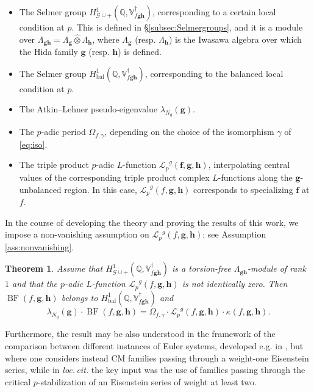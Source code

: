 \documentclass[a4paper,11pt]{amsart}
\theoremstyle{plain}
\newtheorem{theorem}{Theorem}[section]
\theoremstyle{definition}
\theoremstyle{remark}
\newcommand{\bb}{\mathbb}
\newcommand{\cl}{\mathcal}
\DeclareMathOperator{\BF}{BF}
\DeclareMathOperator{\bal}{bal}
\newcommand{\Lp}{{\mathscr{L}_p}}
\newcommand{\hf}{{\mathbf{f}}}
\newcommand{\hg}{{\mathbf{g}}}
\newcommand{\hh}{{\mathbf h}}
\numberwithin{equation}{section}
\begin{document}
\begin{itemize}
    \item[-] The Selmer group $H^1_{\cl{G}\cup +}(\bb{Q}, \bb{V}_{f\hg\hh}^\dagger)$, corresponding to a certain local condition at $p$. This is defined in  \S\ref{subsec:Selmergroups}, and it is a module over $\Lambda_{\hg\hh}=\Lambda_{\hg}\hat{\otimes}\Lambda_{\hh}$, where $\Lambda_{\hg}$ (resp. $\Lambda_{\hh}$) is the Iwasawa algebra over which the Hida family $\hg$ (resp. $\hh$) is defined.
    \item[-] The Selmer group $H^1_{\bal}(\bb{Q}, \bb{V}_{f\hg\hh}^\dagger)$, corresponding to the balanced local condition at $p$.
    \item[-] The Atkin--Lehner pseudo-eigenvalue $\lambda_{N_g}(\hg)$.
    \item[-] The $p$-adic period $\Omega_{f,\gamma}$, depending on the choice of the isomorphism $\gamma$ of \eqref{eq:iso}.
    \item[-] The triple product $p$-adic $L$-function $\Lp^g(\hf,\hg,\hh)$, interpolating central values of the corresponding triple product complex $L$-functions along the $\hg$-unbalanced region. In this case, $\Lp^g(f,\hg,\hh)$ corresponds to specializing $\hf$ at $f$.
\end{itemize}

In the course of developing the theory and proving the results of this work, we impose a non-vanishing assumption on $\Lp^g(f,\hg,\hh)$; see Assumption \ref{ass:nonvanishing}.

\begin{theorem}
Assume that $H^1_{\cl{G}\cup +}(\bb{Q}, \bb{V}_{f\hg\hh}^\dagger)$ is a torsion-free $\Lambda_{\hg\hh}$-module of rank $1$ and that the $p$-adic $L$-function $\Lp^g(f,\hg,\hh)$ is not identically zero. Then $\BF(f,\hg,\hh)$ belongs to $H^1_{\bal}(\bb{Q}, \bb{V}_{f\hg\hh}^\dagger)$ and \[ \lambda_{N_g}(\hg)\cdot\BF(f,\hg,\hh)=\Omega_{f,\gamma}\cdot \Lp^g(f,\hg,\hh) \cdot \kappa(f,\hg,\hh). \]
\end{theorem}

Furthermore, the result may be also understood in the framework of the comparison between different instances of Euler systems, developed e.g. in \cite{LR1}, but where one considers instead CM families passing through a weight-one Eisenstein series, while in \emph{loc.\,cit.} the key input was the use of families passing through the critical $p$-stabilization of an Eisenstein series of weight at least two.
\end{document}
